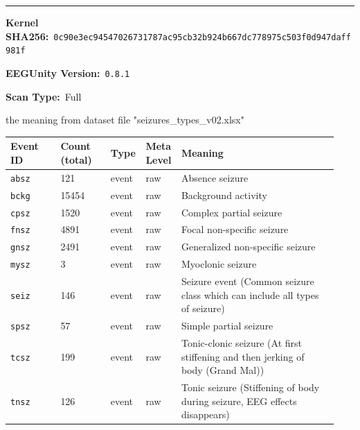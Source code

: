 {\begin{tcolorbox}
\noindent\rule{\linewidth}{0.4pt}\par\nopagebreak
{}\par\smallskip
{\scriptsize
\noindent\textbf{Kernel SHA256:}~\texttt{0c90e3ec94547026731787ac95cb32b924b667dc778975c503f0d947daff981f}\par\smallskip
\noindent\textbf{EEGUnity Version:}~\texttt{0.8.1}\par\smallskip
\noindent\textbf{Scan Type:}~Full\par\smallskip
\noindent the meaning from dataset file "seizures\_types\_v02.xlsx"\par\smallskip
}
\smallskip{}\par\smallskip
\begingroup\scriptsize\setlength{\tabcolsep}{2pt}
\begin{tabular}{@{}p{0.1567\linewidth}p{0.1567\linewidth}p{0.0783\linewidth}p{0.0783\linewidth}p{0.4700\linewidth}@{}}
\toprule
\textbf{Event ID} & \textbf{Count (total)} & \textbf{Type} & \textbf{Meta Level} & \textbf{Meaning} \\
\midrule
\texttt{absz} & 121 & event & raw & Absence seizure \\
\texttt{bckg} & 15454 & event & raw & Background activity \\
\texttt{cpsz} & 1520 & event & raw & Complex partial seizure \\
\texttt{fnsz} & 4891 & event & raw & Focal non-specific seizure \\
\texttt{gnsz} & 2491 & event & raw & Generalized non-specific seizure \\
\texttt{mysz} & 3 & event & raw & Myoclonic seizure \\
\texttt{seiz} & 146 & event & raw & Seizure event (Common seizure class which can include all types of seizure) \\
\texttt{spsz} & 57 & event & raw & Simple partial seizure \\
\texttt{tcsz} & 199 & event & raw & Tonic-clonic seizure (At first stiffening and then jerking of body (Grand Mal)) \\
\texttt{tnsz} & 126 & event & raw & Tonic seizure (Stiffening of body during seizure, EEG effects disappears) \\
\bottomrule
\end{tabular}
\endgroup
\smallskip{}\par\smallskip
\begingroup\scriptsize\setlength{\tabcolsep}{2pt}
\begin{tabular}{@{}p{0.2350\linewidth}p{0.2350\linewidth}p{0.4700\linewidth}@{}}

\end{tabular}
\end{tcolorbox}}

